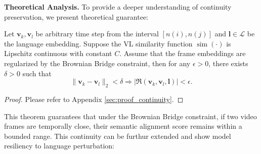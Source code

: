 \noindent\textbf{Theoretical Analysis.} To provide a deeper understanding of continuity preservation, we present theoretical guarantee: \begin{theorem} 
\label{thm:continuity}
Let \(\mathbf{v}_k,\mathbf{v}_l\) be arbitrary time step from the interval $[n(i), n(j)]$ and \(\mathbf{l} \in \mathcal{L} \) be the language embedding. Suppose the VL similarity function \(\operatorname{sim}(\cdot)\) is Lipschitz continuous with constant \( C\). Assume that the frame embeddings are regularized by the Brownian Bridge constraint, then for any \( \epsilon > 0 \), there exists \( \delta > 0 \) such that
\[
\|\mathbf{v}_k -\mathbf{v}_l \|_2 < \delta \Rightarrow \left| \mathfrak{R}(\mathbf{v}_k,\mathbf{v}_l,\mathbf{l}) \right| < \epsilon.
\]
\end{theorem}
\begin{proof}
Please refer to Appendix \ref{sec:proof_continuity}.
\end{proof}
This theorem guarantees that under the Brownian Bridge constraint, if two video frames are temporally close, their semantic alignment score remains within a bounded range. This continuity can be furthur extended and show model resiliency to language perturbation:



